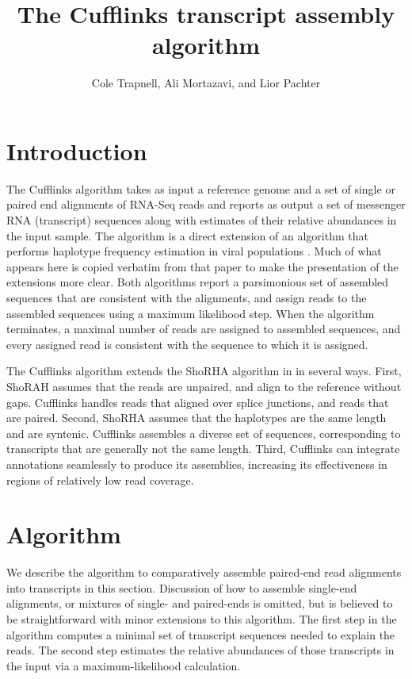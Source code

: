 \documentclass[twocolumn]{homework}
\title{The Cufflinks transcript assembly algorithm}
\author{ Cole Trapnell, Ali Mortazavi, and Lior Pachter }
\theoremstyle{definition}
\begin{document}
\ifpdf
{}
\else
{}
\fi

\maketitle


\section{Introduction}

The Cufflinks algorithm takes as input a reference genome and a set of single or paired end alignments of RNA-Seq reads and reports as output a set of messenger RNA (transcript) sequences along with estimates of their relative abundances in the input sample.  The algorithm is a direct extension of an algorithm that performs haplotype frequency estimation in viral populations \cite{Eriksson:2008p1143}.  Much of what appears here is copied verbatim from that paper to make the presentation of the extensions more clear.  Both algorithms report a parsimonious set of assembled sequences that are consistent with the alignments, and assign reads to the assembled sequences using a maximum likelihood step.  When the algorithm terminates, a maximal number of reads are assigned to assembled sequences, and every assigned read is consistent with the sequence to which it is assigned.

The Cufflinks algorithm extends the ShoRHA algorithm in  \cite{Eriksson:2008p1143} in several ways.  First, ShoRAH assumes that the reads are unpaired, and align to the reference without gaps.  Cufflinks handles reads that aligned over splice junctions, and reads that are paired.  Second, ShoRHA assumes that the haplotypes are the same length and are syntenic.  Cufflinks assembles a diverse set of sequences, corresponding to transcripts that are generally not the same length. Third, Cufflinks can integrate annotations seamlessly to produce its assemblies, increasing its effectiveness in regions of relatively low read coverage.

\section{Algorithm}

We describe the algorithm to comparatively assemble paired-end read alignments into transcripts in this section.  Discussion of how to assemble single-end alignments, or mixtures of single- and paired-ends is omitted, but is believed to be straightforward with minor extensions to this algorithm.  The first step in the algorithm computes a minimal set of transcript sequences needed to explain the reads.  The second step estimates the relative abundances of those transcripts in the input via a maximum-likelihood calculation.
\end{document}
